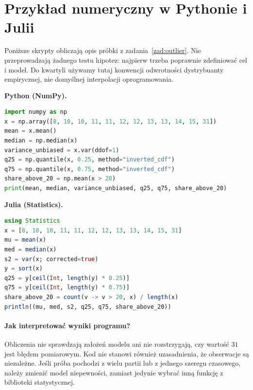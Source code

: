 \documentclass[11pt,a4paper,oneside]{report}
\numberwithin{equation}{chapter}
\theoremstyle{plain}
\theoremstyle{definition}
\theoremstyle{remark}
\begin{document}
\section{Przykład numeryczny w Pythonie i Julii}
Poniższe skrypty obliczają opis próbki z zadania~\ref{zad:outlier}. Nie przeprowadzają żadnego testu hipotez: najpierw trzeba poprawnie zdefiniować cel i model. Do kwartyli używamy tutaj konwencji odwrotności dystrybuanty empirycznej, nie domyślnej interpolacji oprogramowania.

\noindent\textbf{Python (NumPy).}\par
\par
{}
\smallskip
\begin{lstlisting}[language=Python,caption={Opis próby: średnia, mediana, wariancja i kwantyle (Python).}]
import numpy as np
x = np.array([8, 10, 10, 11, 11, 12, 12, 13, 13, 14, 15, 31])
mean = x.mean()
median = np.median(x)
variance_unbiased = x.var(ddof=1)
q25 = np.quantile(x, 0.25, method="inverted_cdf")
q75 = np.quantile(x, 0.75, method="inverted_cdf")
share_above_20 = np.mean(x > 20)
print(mean, median, variance_unbiased, q25, q75, share_above_20)
\end{lstlisting}

\noindent\textbf{Julia (Statistics).}\par
\par
{}
\smallskip
\begin{lstlisting}[language=Julia,caption={Opis próby z użyciem pakietu Statistics (Julia).}]
using Statistics
x = [8, 10, 10, 11, 11, 12, 12, 13, 13, 14, 15, 31]
mu = mean(x)
med = median(x)
s2 = var(x; corrected=true)
y = sort(x)
q25 = y[ceil(Int, length(y) * 0.25)]
q75 = y[ceil(Int, length(y) * 0.75)]
share_above_20 = count(v -> v > 20, x) / length(x)
println((mu, med, s2, q25, q75, share_above_20))
\end{lstlisting}

\paragraph{Jak interpretować wyniki programu?}
Obliczenia nie sprawdzają założeń modelu ani nie rozstrzygają, czy wartość $31$ jest błędem pomiarowym. Kod nie stanowi również uzasadnienia, że obserwacje są niezależne. Jeśli próba pochodzi z wielu partii lub z jednego szeregu czasowego, należy zmienić model niepewności, zamiast jedynie wybrać inną funkcję z biblioteki statystycznej.
\end{document}
